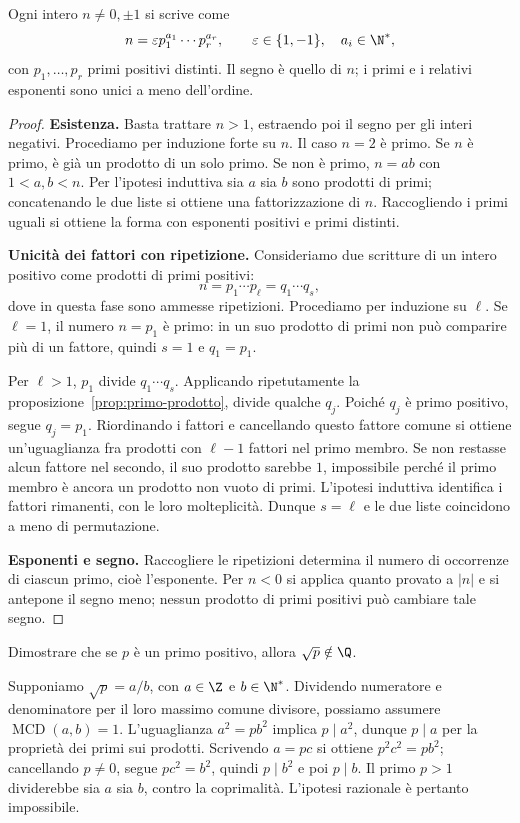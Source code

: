 \begin{teorema}\label{teo:fattorizzazione}
Ogni intero $n\ne0,\pm1$ si scrive come
\[
n=\varepsilon p_1^{a_1}\cdots p_r^{a_r},
\qquad \varepsilon\in\{1,-1\},\quad a_i\in\N^*,
\]
con $p_1,\ldots,p_r$ primi positivi distinti. Il segno è quello di $n$; i primi e i relativi esponenti sono unici a meno dell'ordine.
\end{teorema}
\begin{proof}
\textbf{Esistenza.} Basta trattare $n>1$, estraendo poi il segno per gli interi negativi. Procediamo per induzione forte su $n$. Il caso $n=2$ è primo. Se $n$ è primo, è già un prodotto di un solo primo. Se non è primo, $n=ab$ con $1<a,b<n$. Per l'ipotesi induttiva sia $a$ sia $b$ sono prodotti di primi; concatenando le due liste si ottiene una fattorizzazione di $n$. Raccogliendo i primi uguali si ottiene la forma con esponenti positivi e primi distinti.

\textbf{Unicità dei fattori con ripetizione.} Consideriamo due scritture di un intero positivo come prodotti di primi positivi:
\[
n=p_1\cdots p_\ell=q_1\cdots q_s,
\]
dove in questa fase sono ammesse ripetizioni. Procediamo per induzione su $\ell$. Se $\ell=1$, il numero $n=p_1$ è primo: in un suo prodotto di primi non può comparire più di un fattore, quindi $s=1$ e $q_1=p_1$.

Per $\ell>1$, $p_1$ divide $q_1\cdots q_s$. Applicando ripetutamente la proposizione~\ref{prop:primo-prodotto}, divide qualche $q_j$. Poiché $q_j$ è primo positivo, segue $q_j=p_1$. Riordinando i fattori e cancellando questo fattore comune si ottiene un'uguaglianza fra prodotti con $\ell-1$ fattori nel primo membro. Se non restasse alcun fattore nel secondo, il suo prodotto sarebbe $1$, impossibile perché il primo membro è ancora un prodotto non vuoto di primi. L'ipotesi induttiva identifica i fattori rimanenti, con le loro molteplicità. Dunque $s=\ell$ e le due liste coincidono a meno di permutazione.

\textbf{Esponenti e segno.} Raccogliere le ripetizioni determina il numero di occorrenze di ciascun primo, cioè l'esponente. Per $n<0$ si applica quanto provato a $|n|$ e si antepone il segno meno; nessun prodotto di primi positivi può cambiare tale segno.
\end{proof}

\begin{esercizio}
Dimostrare che se $p$ è un primo positivo, allora $\sqrt p\notin\Q$.
\end{esercizio}
\begin{svolgimento}
Supponiamo $\sqrt p=a/b$, con $a\in\Z$ e $b\in\N^*$. Dividendo numeratore e denominatore per il loro massimo comune divisore, possiamo assumere $\operatorname{MCD}(a,b)=1$. L'uguaglianza $a^2=pb^2$ implica $p\mid a^2$, dunque $p\mid a$ per la proprietà dei primi sui prodotti. Scrivendo $a=pc$ si ottiene $p^2c^2=pb^2$; cancellando $p\ne0$, segue $pc^2=b^2$, quindi $p\mid b^2$ e poi $p\mid b$. Il primo $p>1$ dividerebbe sia $a$ sia $b$, contro la coprimalità. L'ipotesi razionale è pertanto impossibile.
\end{svolgimento}

